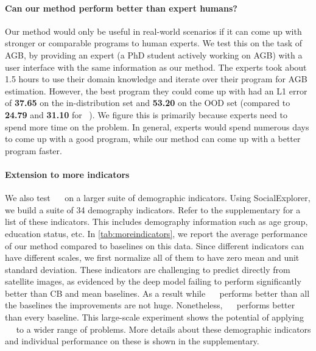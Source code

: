 \paragraph{Can our method perform better than expert humans?}
Our method would only be useful in real-world scenarios if it can come up with stronger or comparable programs to human experts.  
We test this on the task of AGB, by providing an expert (a PhD student actively working on AGB) with a user interface with the same information as our method. 
The experts took about 1.5 hours to use their domain knowledge and iterate over their program for AGB estimation. However, the best program they could come up with had an L1 error of \textbf{37.65} on the in-distribution set and \textbf{53.20} on the OOD set (compared to \textbf{24.79} and \textbf{31.10} for ~\disciple). We figure this is primarily because experts need to spend more time on the problem. 
In general, experts would spend numerous days to come up with a good program, 
while our method can come up with a better program faster.

\paragraph{Extension to more indicators}
We also test ~\disciple~ on a larger suite of demographic indicators. Using SocialExplorer, we build a suite of 34 demography indicators. Refer to the supplementary for a list of these indicators. This includes demography information such as age group, education status, etc. In \cref{tab:moreindicators}, we report the average performance of our method compared to baselines on this data.
Since different indicators can have different scales, we first normalize all of them to have zero mean and unit standard deviation. 
These indicators are challenging to predict directly from satellite images, as evidenced by the deep model failing to perform significantly better than CB and mean baselines. 
As a result while ~\disciple~ performs better than all the baselines the improvements are not huge.
Nonetheless, ~\disciple~ performs better than every baseline.
This large-scale experiment shows the potential of applying ~\disciple~ to a wider range of problems. More details about these demographic indicators and individual performance on these is shown in the supplementary.

